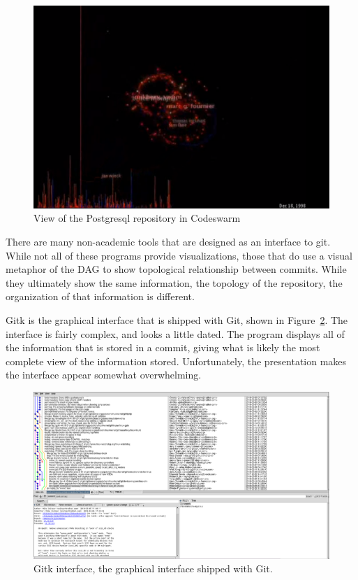 \begin{figure}[htpb]
  \centering
  \includegraphics[width=0.8\linewidth]{Figures/introduction/codeswarm.png}
  \caption{View of the Postgresql repository in Codeswarm\cite{ogawa09}}
  \label{fig:codeswarm}
\end{figure}

There are many non-academic tools that are designed as an interface to
git.
While not all of these programs provide visualizations, those that
do use a visual metaphor of the DAG to show topological relationship
between commits.
While they ultimately show the same information, the topology of the
repository, the organization of that information is different.

Gitk is the graphical interface that is shipped with Git, shown in
Figure~\ref{fig:gitk_all_view}.
The interface is fairly complex, and looks a little dated.
The program displays all of the information that is stored in a commit,
giving what is likely the most complete view of the information stored.
Unfortunately, the presentation makes the interface appear somewhat
overwhelming.

\begin{figure}[htpb]
  \centering
  \includegraphics[width=0.8\linewidth]{Figures/introduction/gitk_full.png}
  \caption{Gitk interface, the graphical interface shipped with Git.}
  \label{fig:gitk_all_view}
\end{figure}

